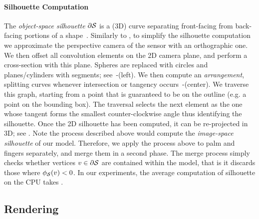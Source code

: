 \paragraph{Silhouette Computation}
The \emph{object-space silhouette} $\partial \mathcal{S}$ is a (3D) curve separating front-facing from back-facing portions of a shape~\cite[Sec.1]{olson2006eg}. Similarly to \cite{tagliasacchi2015robust}, to simplify the silhouette computation we approximate the perspective camera of the sensor with an orthographic one. We then offset all convolution elements on the 2D camera plane, and perform a cross-section with this plane. Spheres are replaced with circles and planes/cylinders with segments; see~-(left). We then compute an \emph{arrangement}, splitting curves whenever intersection or tangency occurs~-(center). We traverse this graph, starting from a point that is guaranteed to be on the outline (e.g. a point on the bounding box). The traversal selects the next element as the one whose tangent forms the smallest counter-clockwise angle thus identifying the silhouette. Once the 2D silhouette has been computed, it can be re-projected in 3D; see . Note the process described above would compute the \emph{image-space silhouette} of our model. Therefore, we apply the process above to palm and fingers separately, and merge them in a second phase. The merge process simply checks whether vertices $v \in \partial \mathcal{S}$ are contained within the model, that is it discards those where $\phi_{\mathcal{S}}(v)<0$. In our experiments, the average computation of silhouette on the CPU takes .

\subsection{Rendering}

